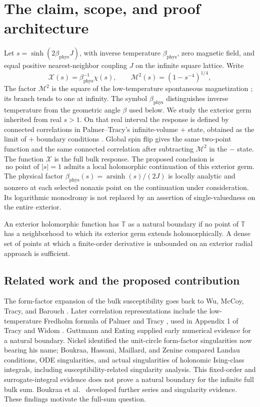 \documentclass[11pt]{article}
\numberwithin{equation}{section}
\theoremstyle{definition}
\newcommand{\T}{\mathbb T}
\newcommand{\M}{\mathcal M}
\begin{document}
\section{The claim, scope, and proof architecture}\label{sec:scope}
Let \(s=\sinh(2\beta_{\mathrm{phys}} J)\), with inverse temperature
\(\beta_{\mathrm{phys}}\), zero magnetic field, and equal positive
nearest-neighbor coupling \(J\) on the infinite square lattice. Write
\[
 \mathcal X(s)=\beta_{\mathrm{phys}}^{-1}\chi(s),\qquad
 \M^2(s)=(1-s^{-4})^{1/4},
\]
The factor \(\M^2\) is the square of the low-temperature spontaneous
magnetization \cite{Yang1952}; its branch tends to one at infinity.
The symbol \(\beta_{\mathrm{phys}}\) distinguishes inverse temperature
from the geometric angle \(\beta\) used below. We study the exterior
germ inherited from real \(s>1\). On that real interval the response is
defined by connected correlations in Palmer--Tracy's infinite-volume
\(+\) state, obtained as the limit of \(+\) boundary conditions
\cite[pp.~332, 361]{PalmerTracy1981}. Global spin flip gives the same
two-point function and the same connected correlation after subtracting
\(\M^2\) in the \(-\) state. The function \(\mathcal X\) is the full
bulk response. The proposed conclusion is
\[
 \text{no point of }|s|=1\text{ admits a local holomorphic
 continuation of this exterior germ.}
\]
The physical factor \(\beta_{\mathrm{phys}}(s)=\operatorname{arsinh}(s)/(2J)\) is locally
analytic and nonzero at each selected nonaxis point on the continuation
under consideration. Its logarithmic monodromy is not replaced by an
assertion of single-valuedness on the entire exterior.

An exterior holomorphic function has \(\T\) as a natural boundary if no
point of \(\T\) has a neighborhood to which its exterior germ extends
holomorphically. A dense set of points at which a finite-order derivative
is unbounded on an exterior radial approach is sufficient.

\subsection{Related work and the proposed contribution}
The form-factor expansion of the bulk susceptibility goes back to
Wu, McCoy, Tracy, and Barouch \cite{WMTB1976}. Later correlation
representations include the low-temperature Fredholm formula of
Palmer and Tracy \cite{PalmerTracy1981}, used in Appendix 1 of
Tracy and Widom \cite{TW2014}. Guttmann and Enting
\cite{GuttmannEnting1996} supplied early numerical evidence for a
natural boundary. Nickel \cite{Nickel1999,Nickel2000} identified
the unit-circle form-factor singularities now bearing his name;
Boukraa, Hassani, Maillard, and Zenine \cite{Boukraa2007}
compared Landau conditions, ODE singularities, and actual singularities
of holonomic Ising-class integrals, including susceptibility-related
singularity analysis. This fixed-order and surrogate-integral evidence
does not prove a natural boundary for the infinite full bulk sum.
Boukraa et al.\ \cite{Boukraa2008} developed further series and
singularity evidence. These findings motivate the full-sum question.
\end{document}
